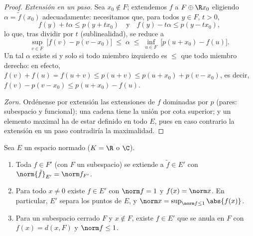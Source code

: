 \begin{proof}
\emph{Extensión en un paso.} Sea $x_0 \notin F$; extendemos $f$ a
$F \oplus \R x_0$ eligiendo $\alpha = \tilde f(x_0)$ adecuadamente:
necesitamos que, para todos $y \in F$, $t > 0$,
\[
f(y) + t\alpha \leq p(y + tx_0)
\quad\text{y}\quad
f(y) - t\alpha \leq p(y - tx_0),
\]
lo que, tras dividir por $t$ (sublinealidad), se reduce a
\[
\sup_{v \in F}\ \bigl[f(v) - p(v - x_0)\bigr]
\;\leq\; \alpha \;\leq\;
\inf_{u \in F}\ \bigl[p(u + x_0) - f(u)\bigr].
\]
Un tal $\alpha$ existe si y solo si todo miembro izquierdo es $\leq$ que
todo miembro derecho: en efecto,
$f(v) + f(u) = f(u + v) \leq p(u + v) \leq
p(u + x_0) + p(v - x_0)$, es decir, $f(v) - p(v - x_0) \leq p(u +
x_0) - f(u)$.

\emph{Zorn.} Ordénense por extensión las extensiones de $f$ dominadas
por $p$ (pares: subespacio y funcional); una cadena tiene la unión por
cota superior; y un elemento maximal ha de estar definido en todo $E$,
pues en caso contrario la extensión en un paso contradiría la
maximalidad.
\end{proof}

\begin{corollary}\label{cor:b3:banach:hbnormed}
Sea $E$ un espacio normado ($K = \R$ o $\C$).
\begin{enumerate}
  \item Toda $f \in F'$ (con $F$ un subespacio) se extiende a $\tilde f
        \in E'$ con $\norm{\tilde f}_{E'} = \norm f_{F'}$. \item Para
  todo $x \neq 0$ existe $f \in E'$ con $\norm f
        = 1$ y $f(x) = \norm x$. En particular, $E'$ separa los puntos
  de $E$, y $\norm x = \sup_{\norm f \leq
        1}\abs{f(x)}$. \item Para un subespacio cerrado $F$ y
  $x \notin F$, existe $f
        \in E'$ que se anula en $F$ con $f(x) = d(x, F)$ y
        $\norm f \leq 1$.
\end{enumerate}
\end{corollary}


